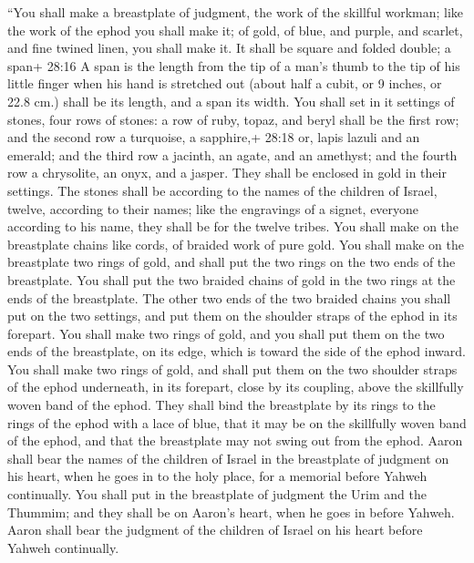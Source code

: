  ``You shall make a breastplate of judgment, the work of
the skillful workman; like the work of the ephod you shall make it; of
gold, of blue, and purple, and scarlet, and fine twined linen, you shall
make it.  It shall be square and folded double; a span+
28:16 A span is the length from the tip of a man's thumb to the tip of
his little finger when his hand is stretched out (about half a cubit, or
9 inches, or 22.8 cm.) shall be its length, and a span its width.
 You shall set in it settings of stones, four rows of
stones: a row of ruby, topaz, and beryl shall be the first row;
 and the second row a turquoise, a sapphire,+ 28:18 or,
lapis lazuli and an emerald;  and the third row a jacinth,
an agate, and an amethyst;  and the fourth row a
chrysolite, an onyx, and a jasper. They shall be enclosed in gold in
their settings.  The stones shall be according to the names
of the children of Israel, twelve, according to their names; like the
engravings of a signet, everyone according to his name, they shall be
for the twelve tribes.  You shall make on the breastplate
chains like cords, of braided work of pure gold.  You shall
make on the breastplate two rings of gold, and shall put the two rings
on the two ends of the breastplate.  You shall put the two
braided chains of gold in the two rings at the ends of the breastplate.
 The other two ends of the two braided chains you shall put
on the two settings, and put them on the shoulder straps of the ephod in
its forepart.  You shall make two rings of gold, and you
shall put them on the two ends of the breastplate, on its edge, which is
toward the side of the ephod inward.  You shall make two
rings of gold, and shall put them on the two shoulder straps of the
ephod underneath, in its forepart, close by its coupling, above the
skillfully woven band of the ephod.  They shall bind the
breastplate by its rings to the rings of the ephod with a lace of blue,
that it may be on the skillfully woven band of the ephod, and that the
breastplate may not swing out from the ephod.  Aaron shall
bear the names of the children of Israel in the breastplate of judgment
on his heart, when he goes in to the holy place, for a memorial before
Yahweh continually.  You shall put in the breastplate of
judgment the Urim and the Thummim; and they shall be on Aaron's heart,
when he goes in before Yahweh. Aaron shall bear the judgment of the
children of Israel on his heart before Yahweh continually.

